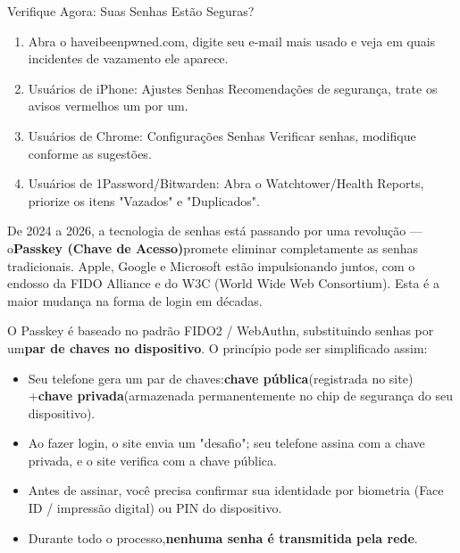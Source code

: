 \begin{tcbpractice}{Verifique Agora: Suas Senhas Estão Seguras?}
\begin{enumerate}
  \item Abra o haveibeenpwned.com, digite seu e-mail mais usado e veja em quais incidentes de vazamento ele aparece.
  \item Usuários de iPhone: Ajustes Senhas Recomendações de segurança, trate os avisos vermelhos um por um.
  \item Usuários de Chrome: Configurações Senhas Verificar senhas, modifique conforme as sugestões.
  \item Usuários de 1Password/Bitwarden: Abra o Watchtower/Health Reports, priorize os itens "Vazados" e "Duplicados".
\end{enumerate}

\end{tcbpractice}


De 2024 a 2026, a tecnologia de senhas está passando por uma revolução — o\textbf{Passkey (Chave de Acesso)}promete eliminar completamente as senhas tradicionais. Apple, Google e Microsoft estão impulsionando juntos, com o endosso da FIDO Alliance e do W3C (World Wide Web Consortium). Esta é a maior mudança na forma de login em décadas.


O Passkey é baseado no padrão FIDO2 / WebAuthn, substituindo senhas por um\textbf{par de chaves no dispositivo}. O princípio pode ser simplificado assim:

\begin{itemize}
  \item Seu telefone gera um par de chaves:\textbf{chave pública}(registrada no site) +\textbf{chave privada}(armazenada permanentemente no chip de segurança do seu dispositivo).
  \item Ao fazer login, o site envia um "desafio"; seu telefone assina com a chave privada, e o site verifica com a chave pública.
  \item Antes de assinar, você precisa confirmar sua identidade por biometria (Face ID / impressão digital) ou PIN do dispositivo.
  \item Durante todo o processo,\textbf{nenhuma senha é transmitida pela rede}.
\end{itemize}



